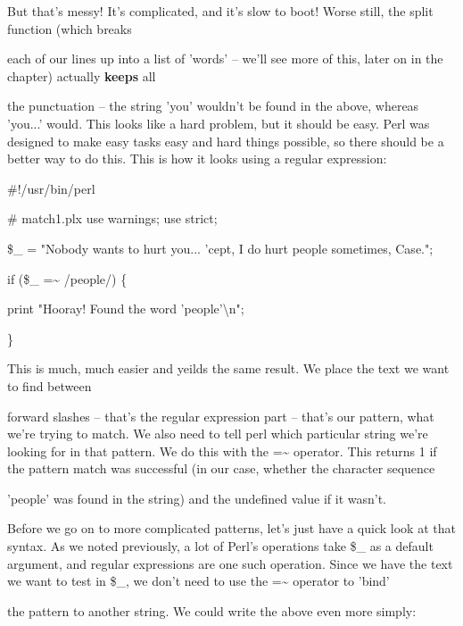 \documentclass[a4paper,11pt]{book}
\begin{document}
\noindent But that's messy! It's complicated, and it's slow to boot! Worse still, the split function (which breaks

\noindent each of our lines up into a list of 'words' -- we'll see more of this, later on in the chapter) actually \textbf{keeps }all

\noindent the punctuation -- the string 'you' wouldn't be found in the above, whereas 'you...' would. This looks like a hard problem, but it should be easy. Perl was designed to make easy tasks easy and hard things possible, so there should be a better way to do this. This is how it looks using a regular expression:

\noindent 

\noindent 

\noindent \#!/usr/bin/perl

\noindent \# match1.plx use warnings; use strict;

\noindent 

\noindent \$\_  = "Nobody wants to hurt you... 'cept, I do hurt people sometimes, Case.";

\noindent 

\noindent if (\$\_  =\~{} /people/) \{

\noindent print "Hooray! Found the word 'people'\textbackslash n";

\noindent \}

\noindent 

\noindent This is much, much easier and yeilds the same result. We place the text we want to find between

\noindent forward slashes -- that's the regular expression part -- that's our pattern, what we're trying to match. We also need to tell perl which particular string we're looking for in that pattern. We do this with the =\~{} operator. This returns 1 if the pattern match was successful (in our case, whether the character sequence

\noindent 'people' was found in the string) and the undefined value if it wasn't.

\noindent 

\noindent Before we go on to more complicated patterns, let's just have a quick look at that syntax. As we noted previously, a lot of Perl's operations take \$\_ as a default argument, and regular expressions are one such operation. Since we have the text we want to test in \$\_, we don't need to use the =\~{} operator to 'bind'

\noindent the pattern to another string. We could write the above even more simply:
\end{document}
